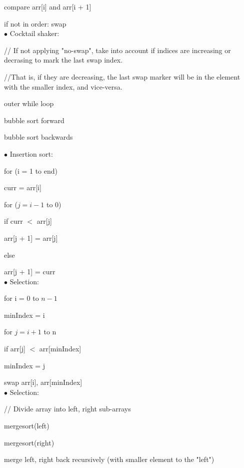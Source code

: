 \documentclass{exam}
\begin{document}
    \qquad compare arr[i] and arr[i + 1]
    
    \qquad if not in order: swap\\
    
    $\bullet$ Cocktail shaker:
    
    // If not applying "no-swap", take into account if indices are increasing or decrasing to mark the last swap index.
    
    //That is, if they are decreasing, the last swap marker will be in the element with the smaller index, and vice-versa.
    
    outer while loop
    
    \qquad bubble sort forward
    
    \qquad bubble sort backwards
    
    \newpage
    
    $\bullet$ Insertion sort:
    
    for (i = 1 to end)
    
    \qquad curr = arr[i]

    \qquad for ($j = i - 1$ to 0)
    
    \qquad \qquad if curr $<$ arr[j]
    
    \qquad \qquad \qquad arr[j + 1] = arr[j]
    
    \qquad \qquad else
    
    \qquad \qquad \qquad arr[j + 1] = curr\\
    
    $\bullet$ Selection:
    
    for i = 0 to $n - 1$
    
    \qquad minIndex = i
    
    \qquad for $j = i + 1$ to n
    
    \qquad \qquad if arr[j] $<$ arr[minIndex]
    
    \qquad \qquad \qquad minIndex = j
    
    \qquad \qquad swap arr[i], arr[minIndex]\\
    
    $\bullet$ Selection:
    
    // Divide array into left, right sub-arrays
    
    mergesort(left)
    
    mergesort(right)
    
    merge left, right back recursively (with smaller element to the "left")
        
    
\end{document}
